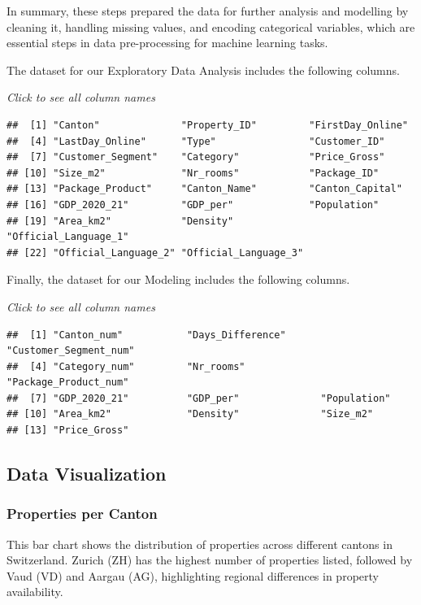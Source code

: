 \documentclass[
]{article}
\begin{document}
In summary, these steps prepared the data for further analysis and
modelling by cleaning it, handling missing values, and encoding
categorical variables, which are essential steps in data pre-processing
for machine learning tasks.

The dataset for our Exploratory Data Analysis includes the following
columns.

\emph{Click to see all column names}

\begin{verbatim}
##  [1] "Canton"              "Property_ID"         "FirstDay_Online"    
##  [4] "LastDay_Online"      "Type"                "Customer_ID"        
##  [7] "Customer_Segment"    "Category"            "Price_Gross"        
## [10] "Size_m2"             "Nr_rooms"            "Package_ID"         
## [13] "Package_Product"     "Canton_Name"         "Canton_Capital"     
## [16] "GDP_2020_21"         "GDP_per"             "Population"         
## [19] "Area_km2"            "Density"             "Official_Language_1"
## [22] "Official_Language_2" "Official_Language_3"
\end{verbatim}

Finally, the dataset for our Modeling includes the following columns.

\emph{Click to see all column names}

\begin{verbatim}
##  [1] "Canton_num"           "Days_Difference"      "Customer_Segment_num"
##  [4] "Category_num"         "Nr_rooms"             "Package_Product_num" 
##  [7] "GDP_2020_21"          "GDP_per"              "Population"          
## [10] "Area_km2"             "Density"              "Size_m2"             
## [13] "Price_Gross"
\end{verbatim}

\subsection{Data Visualization}\label{data-visualization}

\subsubsection{Properties per Canton}\label{properties-per-canton}

This bar chart shows the distribution of properties across different
cantons in Switzerland. Zurich (ZH) has the highest number of properties
listed, followed by Vaud (VD) and Aargau (AG), highlighting regional
differences in property availability.
\end{document}
